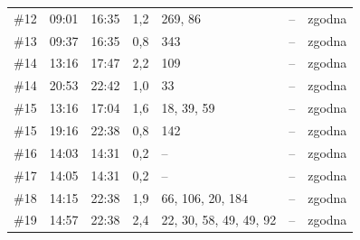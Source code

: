 \documentclass[10pt,a4paper]{article}
\begin{document}
{\begin{longtable}{@{}l l l r p{5.2cm} r l@{}}
\#12 & 09:01 & 16:35 & 1,2 & 269, 86 & -- & zgodna \\
\#13 & 09:37 & 16:35 & 0,8 & 343 & -- & zgodna \\
\#14 & 13:16 & 17:47 & 2,2 & 109 & -- & zgodna \\
\#14 & 20:53 & 22:42 & 1,0 & 33 & -- & zgodna \\
\#15 & 13:16 & 17:04 & 1,6 & 18, 39, 59 & -- & zgodna \\
\#15 & 19:16 & 22:38 & 0,8 & 142 & -- & zgodna \\
\#16 & 14:03 & 14:31 & 0,2 & -- & -- & zgodna \\
\#17 & 14:05 & 14:31 & 0,2 & -- & -- & zgodna \\
\#18 & 14:15 & 22:38 & 1,9 & 66, 106, 20, 184 & -- & zgodna \\
\#19 & 14:57 & 22:38 & 2,4 & 22, 30, 58, 49, 49, 92 & -- & zgodna \\
\end{longtable}}
\end{document}
